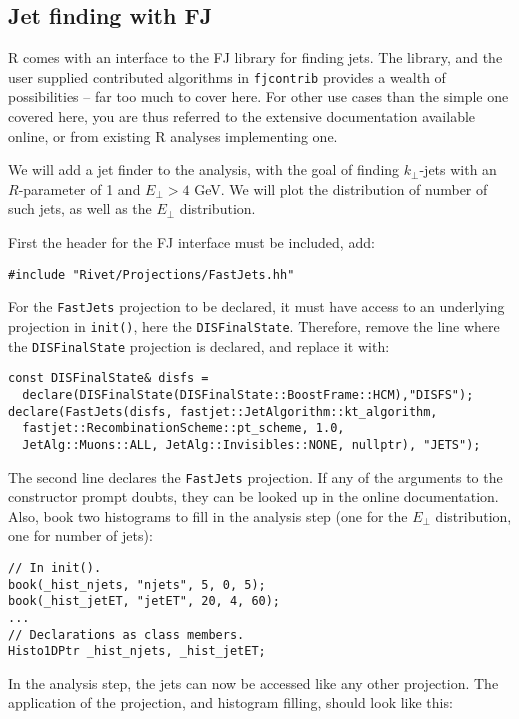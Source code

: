 \documentclass[11pt]{article}
\newcommand{\rivet}{R\protect\scalebox{0.8}{IVET}\xspace}
\newcommand{\fastjet}{F\protect\scalebox{0.8}{AST}J\protect\scalebox{0.8}{ET}\xspace}
\begin{document}
\subsection{Jet finding with \fastjet}
\rivet comes with an interface to the \fastjet library for finding jets. The library, and the user supplied contributed algorithms in \texttt{fjcontrib} provides a wealth of possibilities -- far too much to cover here. For other use cases than the simple one covered here, you are thus referred to the extensive documentation available online, or from existing \rivet analyses implementing one.

We will add a jet finder to the analysis, with the goal of finding $k_\perp$-jets with an $R$-parameter of 1 and $E_\perp > 4$ GeV. We will plot the distribution of number of such jets, as well as the $E_\perp$ distribution.

First the header for the \fastjet interface must be included, add:

\begin{verbatim}
#include "Rivet/Projections/FastJets.hh"
\end{verbatim}

For the \texttt{FastJets} projection to be declared, it must have access to an underlying projection in \texttt{init()}, here the \texttt{DISFinalState}. Therefore, remove the line where the \texttt{DISFinalState} projection is declared, and replace it with:

\begin{verbatim}
const DISFinalState& disfs = 
  declare(DISFinalState(DISFinalState::BoostFrame::HCM),"DISFS");
declare(FastJets(disfs, fastjet::JetAlgorithm::kt_algorithm, 
  fastjet::RecombinationScheme::pt_scheme, 1.0,
  JetAlg::Muons::ALL, JetAlg::Invisibles::NONE, nullptr), "JETS");
\end{verbatim}

The second line declares the \texttt{FastJets} projection. If any of the arguments to the constructor prompt doubts, they can be looked up in the online documentation. Also, book two histograms to fill in the analysis step (one for the $E_\perp$ distribution, one for number of jets):

\begin{verbatim}
// In init().
book(_hist_njets, "njets", 5, 0, 5);
book(_hist_jetET, "jetET", 20, 4, 60);
...
// Declarations as class members.
Histo1DPtr _hist_njets, _hist_jetET;
\end{verbatim}

In the analysis step, the jets can now be accessed like any other projection. The application of the projection, and histogram filling, should look like this:
\end{document}
